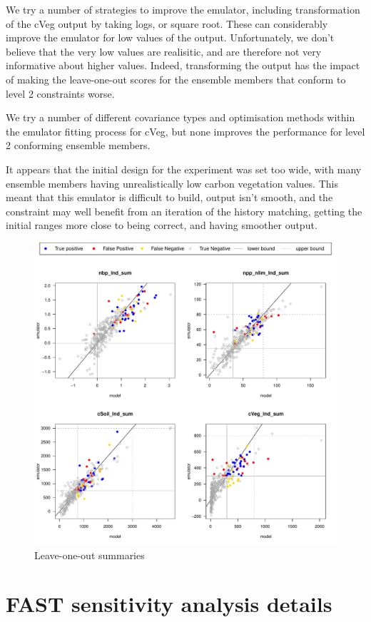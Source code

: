 \documentclass[gmd, manuscript]{copernicus}
\begin{document}
We try a number of strategies to improve the emulator, including transformation of the cVeg output by taking logs, or square root. These can considerably improve the emulator for low values of the output. Unfortunately, we don't believe that the very low values are realisitic, and are therefore not very informative about higher values. Indeed, transforming the output has the impact of making the leave-one-out scores for the ensemble members that conform to level 2 constraints worse.

We try a number of different covariance types and optimisation methods within the emulator fitting process for cVeg, but none improves the performance for level 2 conforming ensemble members.

It appears that the initial design for the experiment was set too wide, with many ensemble members having unrealistically low carbon vegetation values. This meant that this emulator is difficult to build, output isn't smooth, and the constraint may well benefit from an iteration of the history matching, getting the initial ranges more close to being correct, and having smoother output.



\begin{figure}[t]
\includegraphics[width=12cm]{./figs/figA04.pdf}
\caption{Leave-one-out summaries }
\label{fig:Y_const_loo}
\end{figure}

\section{FAST sensitivity analysis details}\label{app:sa_fast}
\end{document}
